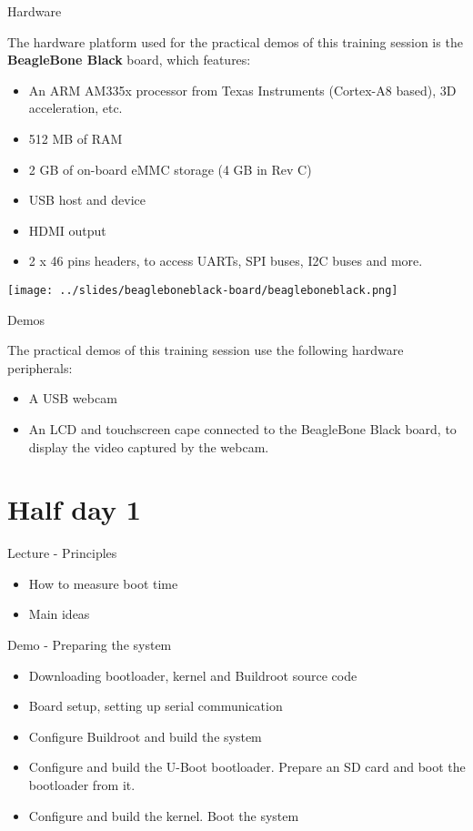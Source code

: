 \documentclass[a4paper,12pt,obeyspaces,spaces,hyphens]{article}
\begin{document}
\feshowtitle

\feshowinfo

\feagendatwocolumn
{Hardware}
{
  The hardware platform used for the practical demos of this training
  session is the {\bf BeagleBone Black} board, which features:

  \begin{itemize}
  \item An ARM AM335x processor from Texas Instruments (Cortex-A8
    based), 3D acceleration, etc.
  \item 512 MB of RAM
  \item 2 GB of on-board eMMC storage
        \newline(4 GB in Rev C)
  \item USB host and device
  \item HDMI output
  \item 2 x 46 pins headers, to access UARTs, SPI buses, I2C buses
    and more.
  \end{itemize}
}
{}
{
  \begin{center}
    \texttt{[image: ../slides/beagleboneblack-board/beagleboneblack.png]}
  \end{center}
}

\feagendaonecolumn
{Demos}
{
  The practical demos of this training session use the following
  hardware peripherals:

  \begin{itemize}
  \item A USB webcam
  \item An LCD and touchscreen cape connected to the
    BeagleBone Black board, to display the video captured by the webcam.
  \end{itemize}
}

\section{Half day 1}

\feagendatwocolumn
{Lecture - Principles}
{
  \begin{itemize}
  \item How to measure boot time
  \item Main ideas
  \end{itemize}
}
{Demo - Preparing the system}
{
 \begin{itemize}
 \item Downloading bootloader, kernel and Buildroot source code
 \item Board setup, setting up serial communication
 \item Configure Buildroot and build the system
 \item Configure and build the U-Boot bootloader. Prepare an SD card
       and boot the bootloader from it.
 \item Configure and build the kernel. Boot the system
 \end{itemize}
}
\end{document}
